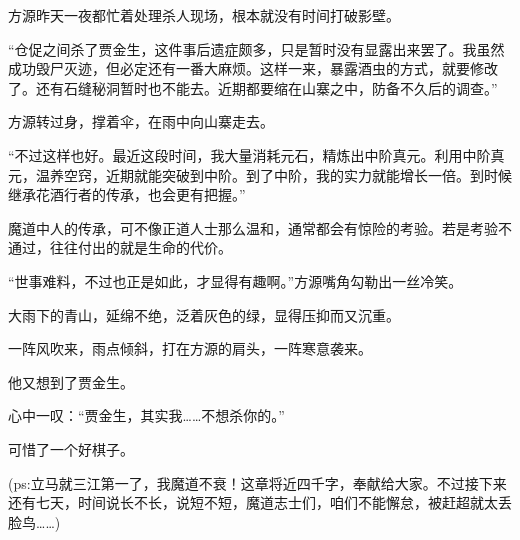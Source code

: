 \begin{this_body}
方源昨天一夜都忙着处理杀人现场，根本就没有时间打破影壁。

“仓促之间杀了贾金生，这件事后遗症颇多，只是暂时没有显露出来罢了。我虽然成功毁尸灭迹，但必定还有一番大麻烦。这样一来，暴露酒虫的方式，就要修改了。还有石缝秘洞暂时也不能去。近期都要缩在山寨之中，防备不久后的调查。”

方源转过身，撑着伞，在雨中向山寨走去。

“不过这样也好。最近这段时间，我大量消耗元石，精炼出中阶真元。利用中阶真元，温养空窍，近期就能突破到中阶。到了中阶，我的实力就能增长一倍。到时候继承花酒行者的传承，也会更有把握。”

魔道中人的传承，可不像正道人士那么温和，通常都会有惊险的考验。若是考验不通过，往往付出的就是生命的代价。

“世事难料，不过也正是如此，才显得有趣啊。”方源嘴角勾勒出一丝冷笑。

大雨下的青山，延绵不绝，泛着灰色的绿，显得压抑而又沉重。

一阵风吹来，雨点倾斜，打在方源的肩头，一阵寒意袭来。

他又想到了贾金生。

心中一叹：“贾金生，其实我……不想杀你的。”

可惜了一个好棋子。

(ps:立马就三江第一了，我魔道不衰！这章将近四千字，奉献给大家。不过接下来还有七天，时间说长不长，说短不短，魔道志士们，咱们不能懈怠，被赶超就太丢脸鸟……)

\end{this_body}

